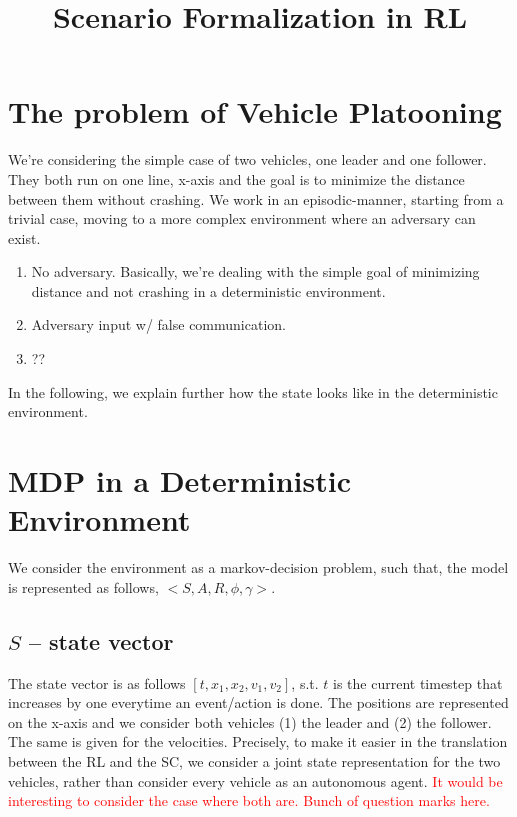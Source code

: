 \documentclass[a4paper,11pt]{article}
\begin{document}
\date{}

\title{Scenario Formalization in RL}


\maketitle 


\section{The problem of Vehicle Platooning}
We're considering the simple case of two vehicles, one leader and one follower. 
They both run on one line, x-axis and the goal is to minimize the distance between them without crashing. 
We work in an episodic-manner, starting from a trivial case, moving to a more complex environment where an adversary can exist. \newline 
\begin{enumerate}
    \item No adversary. Basically, we're dealing with the simple goal of minimizing distance and not crashing in a deterministic environment. 
    \item Adversary input w/ false communication.
    \item ?? 
\end{enumerate}
In the following, we explain further how the state looks like in the deterministic environment. 

\section{MDP in a Deterministic Environment}
We consider the environment as a markov-decision problem, such that, the model is represented as follows, $<S,A,R,\phi,\gamma>$. 
\subsection{$S$ -- state vector}
The state vector is as follows $[t,x_1,x_2,v_1,v_2]$, s.t. $t$ is the current timestep that increases by one everytime an event/action is done. 
The positions are represented on the x-axis and we consider both vehicles (1) the leader and (2) the follower. The same is given for the velocities.
Precisely, to make it easier in the translation between the RL and the SC, we consider a joint state representation for the two vehicles, rather than 
consider every vehicle as an autonomous agent. \textcolor{red}{It would be interesting to consider the case where both are. Bunch of question marks here.}
\end{document}
